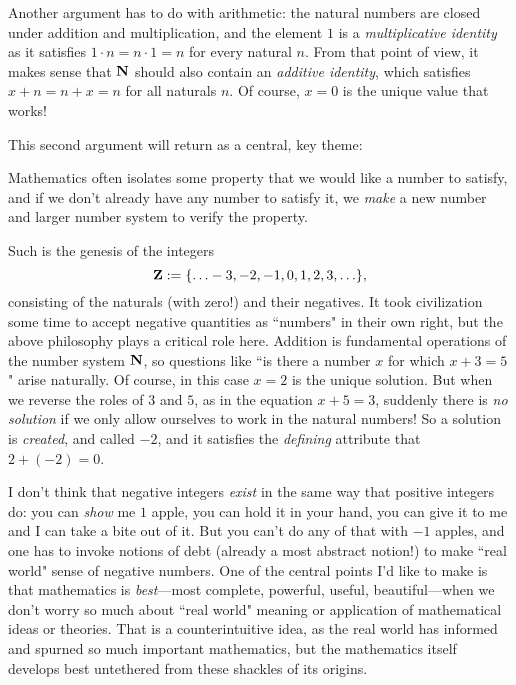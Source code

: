 \documentclass[11pt,oneside]{amsart}
\begin{document}
Another argument has to do with arithmetic: the natural numbers are closed under 
addition and multiplication, and the element $1$ is a 
{\em multiplicative identity} as it satisfies $1\cdot n=n\cdot 1=n$ for every 
natural $n$.  From that point of view, it makes sense that $\mathbf{N}$ should also 
contain an {\em additive identity}, which satisfies $x + n = n + x = n$ for 
all naturals $n$.  Of course, $x=0$ is the unique value that works!

This second argument will return as a central, key theme: 
\begin{philosophy}
	Mathematics often isolates some property that we would like a number to 
  satisfy, and if we don't already have any number to satisfy it, we {\em make} 
  a new number and larger number system to verify the property. 
\end{philosophy}

Such is the genesis of the integers
\[\mathbf{Z}:=\{\ldots -3,-2,-1,0,1,2,3,\ldots\},\]
consisting of the naturals (with zero!) and their negatives.  
It took civilization some time to accept negative quantities as ``numbers" in 
their own right, but the above philosophy plays a critical role here.  
Addition is fundamental operations of the number system $\mathbf{N}$,
so questions like ``is there a number $x$ for which $x+3=5$" arise naturally.  
Of course, in this case $x=2$ is the unique solution.
But when we reverse the roles of $3$ and $5$, as in the equation $x+5=3$, 
suddenly there is {\em no solution} if we only allow ourselves to 
work in the natural numbers!  So a solution is {\em created}, and called $-2$, 
and it satisfies the {\em defining} attribute that $2 + (-2) = 0$.

I don't think that negative integers {\em exist} in the same way that positive integers do: you can {\em show} me $1$ apple, you can hold it in your hand,
you can give it to me and I can take a bite out of it.  But you can't do any of that with $-1$ apples, and one has to invoke notions of debt (already a most abstract notion!) to make ``real world" sense of negative numbers. One of the central points I'd like to make is that mathematics is {\em best}---most complete, powerful, useful, beautiful---when we don't worry so much about ``real world" meaning or application of mathematical ideas or theories.  That is a counterintuitive idea, 
as the real world has informed and spurned so much important mathematics, but the mathematics itself develops best untethered from these shackles of its origins.
\end{document}
